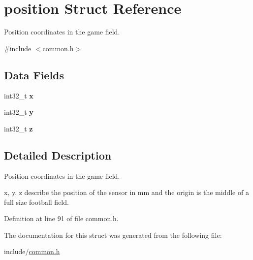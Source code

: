 \hypertarget{structposition}{}\section{position Struct Reference}
\label{structposition}


Position coordinates in the game field.  




{\ttfamily \#include $<$common.\+h$>$}

\subsection*{Data Fields}
\begin{DoxyCompactItemize}
\item 
\mbox{\label{structposition_a0c61c6729b6e80082b774972c0cc2fba}} 
int32\+\_\+t {\bfseries x}
\item 
\mbox{\label{structposition_a571440695a28e82fd4a074d7db3800a1}} 
int32\+\_\+t {\bfseries y}
\item 
\mbox{\label{structposition_a2a609b23accc6ed1efca4fa86b569cf9}} 
int32\+\_\+t {\bfseries z}
\end{DoxyCompactItemize}


\subsection{Detailed Description}
Position coordinates in the game field. 

x, y, z describe the position of the sensor in mm and the origin is the middle of a full size football field. 

Definition at line 91 of file common.\+h.



The documentation for this struct was generated from the following file\+:\begin{DoxyCompactItemize}
\item 
include/\mbox{\hyperlink{common_8h}{common.\+h}}\end{DoxyCompactItemize}
